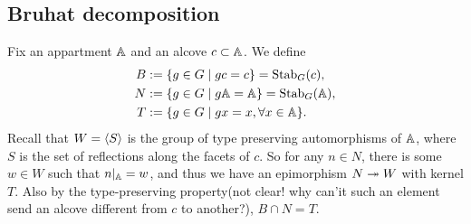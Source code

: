 \documentclass{article}
\begin{document}
\subsection{Bruhat decomposition}



Fix an appartment $\mathbb{A}$ and an alcove $c\subset\mathbb{A}$.
We define \begin{align*}
    B &:= \{g\in G\mid gc = c\} =\operatorname{Stab}_{G}(c),\\
    N &:= \{g\in G\mid g\mathbb{A} = \mathbb{A}\} = \operatorname{Stab}_{G}(\mathbb{A}),\\
    T &:= \{g\in G\mid gx = x,\forall x\in\mathbb{A}\}.
\end{align*}
Recall that $W = \left\langle S \right\rangle$ is the group of type preserving automorphisms of $\mathbb{A}$, where $S$ is the set of reflections along the facets of $c$.
So for any $n\in N$,
there is some $w\in W$ such that $n|_{\mathbb{A}} = w$, and thus we have an epimorphism $N\twoheadrightarrow W$ with kernel $T$.
Also by the type-preserving property(not clear! why can'it such an element send an alcove different from $c$ to another?),
$B\cap N = T$.
\end{document}
